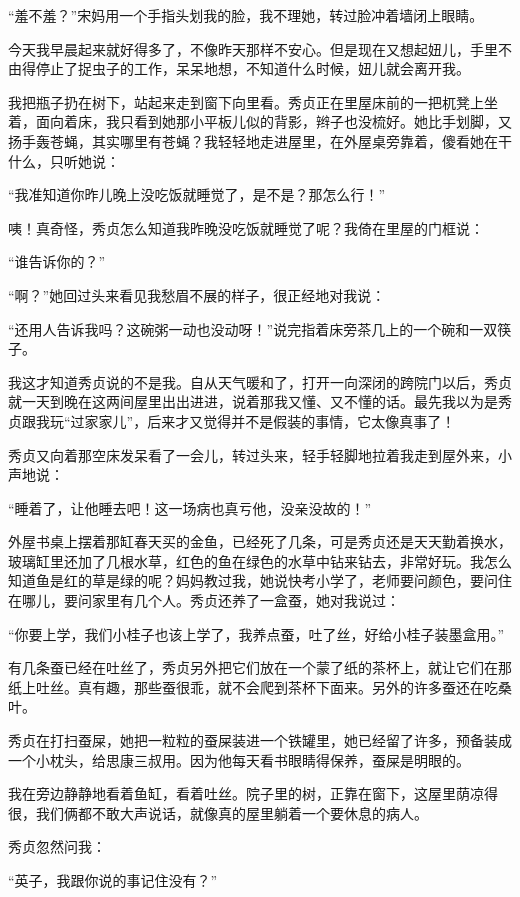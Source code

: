 \par “羞不羞？”宋妈用一个手指头划我的脸，我不理她，转过脸冲着墙闭上眼睛。
\par 今天我早晨起来就好得多了，不像昨天那样不安心。但是现在又想起妞儿，手里不由得停止了捉虫子的工作，呆呆地想，不知道什么时候，妞儿就会离开我。
\par 我把瓶子扔在树下，站起来走到窗下向里看。秀贞正在里屋床前的一把杌凳上坐着，面向着床，我只看到她那小平板儿似的背影，辫子也没梳好。她比手划脚，又扬手轰苍蝇，其实哪里有苍蝇？我轻轻地走进屋里，在外屋桌旁靠着，傻看她在干什么，只听她说：
\par “我准知道你昨儿晚上没吃饭就睡觉了，是不是？那怎么行！”
\par 咦！真奇怪，秀贞怎么知道我昨晚没吃饭就睡觉了呢？我倚在里屋的门框说：
\par “谁告诉你的？”
\par “啊？”她回过头来看见我愁眉不展的样子，很正经地对我说：
\par “还用人告诉我吗？这碗粥一动也没动呀！”说完指着床旁茶几上的一个碗和一双筷子。
\par 我这才知道秀贞说的不是我。自从天气暖和了，打开一向深闭的跨院门以后，秀贞就一天到晚在这两间屋里出出进进，说着那我又懂、又不懂的话。最先我以为是秀贞跟我玩“过家家儿”，后来才又觉得并不是假装的事情，它太像真事了！
\par 秀贞又向着那空床发呆看了一会儿，转过头来，轻手轻脚地拉着我走到屋外来，小声地说：
\par “睡着了，让他睡去吧！这一场病也真亏他，没亲没故的！”
\par 外屋书桌上摆着那缸春天买的金鱼，已经死了几条，可是秀贞还是天天勤着换水，玻璃缸里还加了几根水草，红色的鱼在绿色的水草中钻来钻去，非常好玩。我怎么知道鱼是红的草是绿的呢？妈妈教过我，她说快考小学了，老师要问颜色，要问住在哪儿，要问家里有几个人。秀贞还养了一盒蚕，她对我说过：
\par “你要上学，我们小桂子也该上学了，我养点蚕，吐了丝，好给小桂子装墨盒用。”
\par 有几条蚕已经在吐丝了，秀贞另外把它们放在一个蒙了纸的茶杯上，就让它们在那纸上吐丝。真有趣，那些蚕很乖，就不会爬到茶杯下面来。另外的许多蚕还在吃桑叶。
\par 秀贞在打扫蚕屎，她把一粒粒的蚕屎装进一个铁罐里，她已经留了许多，预备装成一个小枕头，给思康三叔用。因为他每天看书眼睛得保养，蚕屎是明眼的。
\par 我在旁边静静地看着鱼缸，看着吐丝。院子里的树，正靠在窗下，这屋里荫凉得很，我们俩都不敢大声说话，就像真的屋里躺着一个要休息的病人。
\par 秀贞忽然问我：
\par “英子，我跟你说的事记住没有？”
